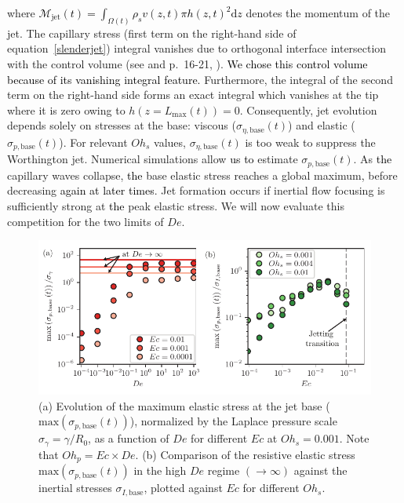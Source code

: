 \documentclass{jfm}
\newcommand{\DL}[1]{{\textcolor{black}{#1}}}
\newcommand{\AO}[1]{{\textcolor{black}{#1}}}
\newcommand{\AKD}[1]{{\textcolor{black}{#1}}}
\newcommand{\oo}{\color{black} \normalfont}
\newcommand{\bb}{\color{black} \normalfont}
\begin{document}
\noindent where
\AKD{$\mathcal{M}_{\text{jet}}(t) = \int_{\Omega(t)}\rho_sv(z,t)\pi h(z,t)^2\mathrm{d}z$}
denotes the momentum of the jet.
The capillary stress (first term on the right-hand side of equation~\eqref{slenderjet}) integral vanishes due to orthogonal interface intersection with the control volume (see \citet{marchand2011surface} and p.~16-21, \citet{munro2019coalescence}). \AO{We chose this control volume because of its vanishing integral feature.}
Furthermore, the integral of the second term on the right-hand side forms an exact integral which vanishes at the tip where it is zero owing to $h(z = L_{\text{max}}(t)) = 0$.
Consequently, jet evolution depends solely on stresses at the base: viscous ($\sigma_{\eta,\text{base}}(t)$) and elastic ($\sigma_{p,\text{base}}(t)$).
For relevant $Oh_s$ values, $\sigma_{\eta,\text{base}}(t)$ is too weak to suppress the Worthington jet. Numerical simulations allow \AO{us} \DL{to} estimate $\sigma_{p,\text{base}}(t)$. As \DL{the} capillary waves collapse, \DL{the} base elastic stress reaches a global maximum\DL{,} before decreasing \DL{again at later times}. Jet formation occurs if inertial flow focusing is sufficiently strong at \DL{the} peak elastic stress. We will now evaluate this competition for the two limits of $De$.

\begin{figure}
	\centering
	\includegraphics[width=\textwidth]{Stress_De_Ec_03-eps-converted-to.pdf}
	\caption{(a) Evolution of the maximum elastic stress at the jet base ($\text{max}\left(\sigma_{p,\text{base}}(t)\right)$), normalized by the Laplace pressure scale $\sigma_\gamma = \gamma/R_0$, as a function of $De$ for different $Ec$ at $Oh_s = 0.001$. {\oo Note that $Oh_p = Ec\times De$. \bb} (b)  Comparison of the resistive elastic stress $\text{max}\left(\sigma_{p,\text{base}}(t)\right)$ in the high $De$ regime $\left(\to \infty \right)$ against the inertial stresses $\sigma_{I,\text{base}}$, plotted against $Ec$ for different $Oh_s$.}
	\label{stress_De}
\end{figure}
\end{document}
